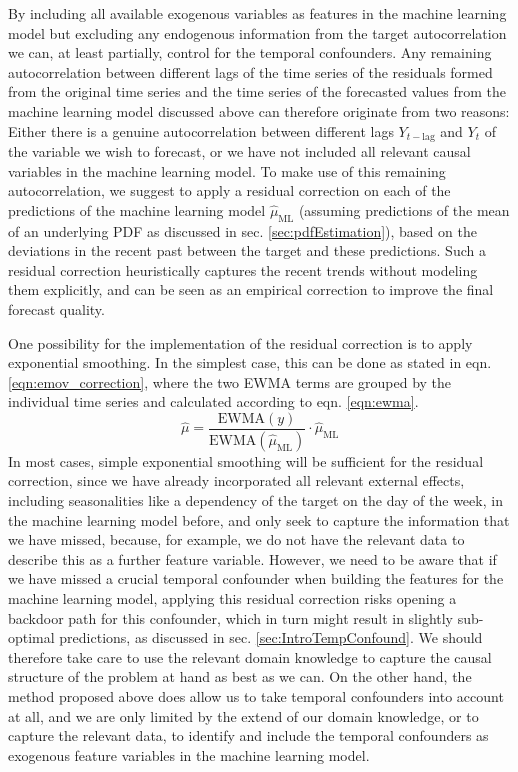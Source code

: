 \documentclass[BCOR=1mm, DIV=calc,10pt,
twoside=true,
twocolumn,
headings=normal]{scrartcl}
\begin{document}
By including all available exogenous variables as features in the machine learning model but excluding any endogenous information from the target autocorrelation we can, at least partially, control for the temporal confounders. Any remaining autocorrelation between different lags of the time series of the residuals formed from the original time series and the time series of the forecasted values from the machine learning model discussed above can therefore originate from two reasons: Either there is a genuine autocorrelation between different lags $Y_{t-\mathrm{lag}}$ and $Y_t$ of the variable we wish to forecast, or we have not included all relevant causal variables in the machine learning model. To make use of this remaining autocorrelation, we suggest to apply a residual correction on each of the predictions of the machine learning model $\hat{\mu}_{\mathrm{ML}}$ (assuming predictions of the mean of an underlying PDF as discussed in sec. \ref{sec:pdfEstimation}), based on the deviations in the recent past between the target and these predictions. Such a residual correction heuristically captures the recent trends without modeling them explicitly, and can be seen as an empirical correction to improve the final forecast quality.

One possibility for the implementation of the residual correction is to apply exponential smoothing. In the simplest case, this can be done as stated in eqn. \ref{eqn:emov_correction}, where the two EWMA terms are grouped by the individual time series and calculated according to eqn. \ref{eqn:ewma}.
\begin{equation} \label{eqn:emov_correction}
\hat{\mu} = \frac{\mathrm{EWMA}(y)}{\mathrm{EWMA}(\hat{\mu}_{\mathrm{ML}})} \cdot \hat{\mu}_{\mathrm{ML}}
\end{equation}
In most cases, simple exponential smoothing will be sufficient for the residual correction, since we have already incorporated all relevant external effects, including seasonalities like a dependency of the target on the day of the week, in the machine learning model before, and only seek to capture the information that we have missed, because, for example, we do not have the relevant data to describe this as a further feature variable. However, we need to be aware that if we have missed a crucial temporal confounder when building the features for the machine learning model, applying this residual correction risks opening a backdoor path for this confounder, which in turn might result in slightly sub-optimal predictions, as discussed in sec. \ref{sec:IntroTempConfound}. We should therefore take care to use the relevant domain knowledge to capture the causal structure of the problem at hand as best as we can. On the other hand, the method proposed above does allow us to take temporal confounders into account at all, and we are only limited by the extend of our domain knowledge, or to capture the relevant data, to identify and include the temporal confounders as exogenous feature variables in the machine learning model.
\end{document}
